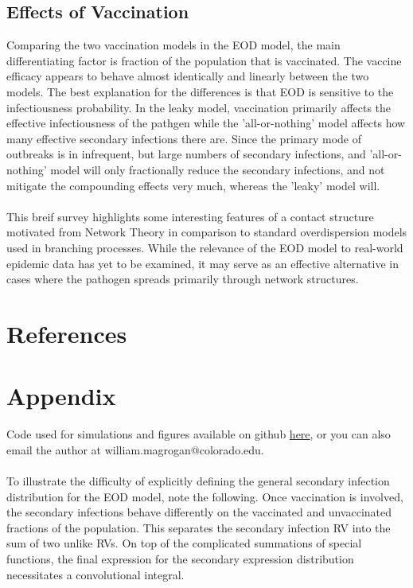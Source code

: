 \documentclass[11pt, twocolumn]{article}
\begin{document}
\subsection*{Effects of Vaccination}
Comparing the two vaccination models in the EOD model, the main differentiating factor is fraction of the population that is vaccinated. The vaccine efficacy appears to behave almost identically and linearly between the two models. The best explanation for the differences is that EOD is sensitive to the infectiousness probability. In the leaky model, vaccination primarily affects the effective infectiousness of the pathgen while the 'all-or-nothing' model affects how many effective secondary infections there are. Since the primary mode of outbreaks is in infrequent, but large numbers of secondary infections, and 'all-or-nothing' model will only fractionally reduce the secondary infections, and not mitigate the compounding effects very much, whereas the 'leaky' model will.\\ \\
This breif survey highlights some interesting features of a contact structure motivated from Network Theory in comparison to standard overdispersion models used in branching processes. While the relevance of the EOD model to real-world epidemic data has yet to be examined, it may serve as an effective alternative in cases where the pathogen spreads primarily through network structures. 
\section*{References}
\section*{Appendix}
Code used for simulations and figures available on github  \href{https://github.com/WilliamMagrogan/InfectiousDiseaseModeling}{here}, or you can also email the author at william.magrogan@colorado.edu.\\ \\
To illustrate the difficulty of explicitly defining the general secondary infection distribution for the EOD model, note the following. Once vaccination is involved, the secondary infections behave differently on the vaccinated and unvaccinated fractions of the population. This separates the secondary infection RV into the sum of two unlike RVs. On top of the complicated summations of special functions, the final expression for the secondary expression distribution necessitates a convolutional integral.
\end{document}
